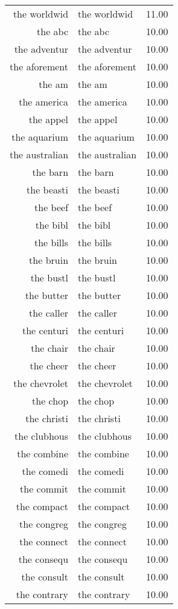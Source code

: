 \begin{table}[ht]
\begin{tabular}{rlr}
  the worldwid & the worldwid & 11.00 \\ 
  the abc & the abc & 10.00 \\ 
  the adventur & the adventur & 10.00 \\ 
  the aforement & the aforement & 10.00 \\ 
  the am & the am & 10.00 \\ 
  the america & the america & 10.00 \\ 
  the appel & the appel & 10.00 \\ 
  the aquarium & the aquarium & 10.00 \\ 
  the australian & the australian & 10.00 \\ 
  the barn & the barn & 10.00 \\ 
  the beasti & the beasti & 10.00 \\ 
  the beef & the beef & 10.00 \\ 
  the bibl & the bibl & 10.00 \\ 
  the bills & the bills & 10.00 \\ 
  the bruin & the bruin & 10.00 \\ 
  the bustl & the bustl & 10.00 \\ 
  the butter & the butter & 10.00 \\ 
  the caller & the caller & 10.00 \\ 
  the centuri & the centuri & 10.00 \\ 
  the chair & the chair & 10.00 \\ 
  the cheer & the cheer & 10.00 \\ 
  the chevrolet & the chevrolet & 10.00 \\ 
  the chop & the chop & 10.00 \\ 
  the christi & the christi & 10.00 \\ 
  the clubhous & the clubhous & 10.00 \\ 
  the combine & the combine & 10.00 \\ 
  the comedi & the comedi & 10.00 \\ 
  the commit & the commit & 10.00 \\ 
  the compact & the compact & 10.00 \\ 
  the congreg & the congreg & 10.00 \\ 
  the connect & the connect & 10.00 \\ 
  the consequ & the consequ & 10.00 \\ 
  the consult & the consult & 10.00 \\ 
  the contrary & the contrary & 10.00 \\ 

\end{tabular}
\end{table}
